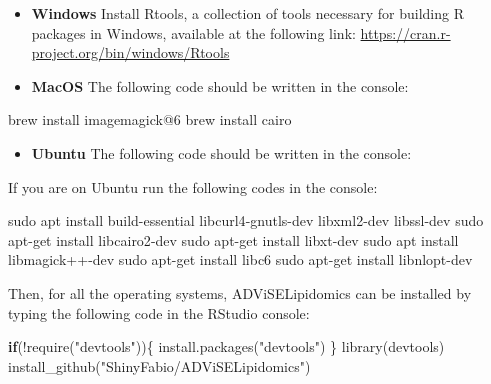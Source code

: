 \documentclass[
]{book}
\newenvironment{Shaded}{\begin{snugshade}}{\end{snugshade}}
\newcommand{\ControlFlowTok}[1]{\textcolor[rgb]{0.13,0.29,0.53}{\textbf{#1}}}
\newcommand{\DecValTok}[1]{\textcolor[rgb]{0.00,0.00,0.81}{#1}}
\newcommand{\FunctionTok}[1]{\textcolor[rgb]{0.00,0.00,0.00}{#1}}
\newcommand{\NormalTok}[1]{#1}
\newcommand{\SpecialCharTok}[1]{\textcolor[rgb]{0.00,0.00,0.00}{#1}}
\newcommand{\StringTok}[1]{\textcolor[rgb]{0.31,0.60,0.02}{#1}}
\providecommand{\tightlist}{%
  \setlength{\itemsep}{0pt}\setlength{\parskip}{0pt}}
\begin{document}
\begin{itemize}
\item
  \textbf{Windows} Install Rtools, a collection of tools necessary for building R packages in Windows, available at the following link: \url{https://cran.r-project.org/bin/windows/Rtools}
\item
  \textbf{MacOS} The following code should be written in the console:
\end{itemize}

\begin{Shaded}
\begin{Highlighting}[]
\NormalTok{brew install imagemagick}\SpecialCharTok{@}\DecValTok{6}
\NormalTok{brew install cairo}
\end{Highlighting}
\end{Shaded}

\begin{itemize}
\tightlist
\item
  \textbf{Ubuntu} The following code should be written in the console:
\end{itemize}

If you are on Ubuntu run the following codes in the console:

\begin{Shaded}
\begin{Highlighting}[]
\NormalTok{sudo apt install build}\SpecialCharTok{{-}}\NormalTok{essential libcurl4}\SpecialCharTok{{-}}\NormalTok{gnutls}\SpecialCharTok{{-}}\NormalTok{dev libxml2}\SpecialCharTok{{-}}\NormalTok{dev libssl}\SpecialCharTok{{-}}\NormalTok{dev}
\NormalTok{sudo apt}\SpecialCharTok{{-}}\NormalTok{get install libcairo2}\SpecialCharTok{{-}}\NormalTok{dev}
\NormalTok{sudo apt}\SpecialCharTok{{-}}\NormalTok{get install libxt}\SpecialCharTok{{-}}\NormalTok{dev}
\NormalTok{sudo apt install libmagick}\SpecialCharTok{++{-}}\NormalTok{dev}
\NormalTok{sudo apt}\SpecialCharTok{{-}}\NormalTok{get install libc6}
\NormalTok{sudo apt}\SpecialCharTok{{-}}\NormalTok{get install libnlopt}\SpecialCharTok{{-}}\NormalTok{dev}
\end{Highlighting}
\end{Shaded}

Then, for all the operating systems, ADViSELipidomics can be installed by typing the following code in the RStudio console:

\begin{Shaded}
\begin{Highlighting}[]
\ControlFlowTok{if}\NormalTok{(}\SpecialCharTok{!}\FunctionTok{require}\NormalTok{(}\StringTok{"devtools"}\NormalTok{))\{}
  \FunctionTok{install.packages}\NormalTok{(}\StringTok{"devtools"}\NormalTok{)}
\NormalTok{\}}
\FunctionTok{library}\NormalTok{(devtools)}
\FunctionTok{install\_github}\NormalTok{(}\StringTok{"ShinyFabio/ADViSELipidomics"}\NormalTok{)}
\end{Highlighting}
\end{Shaded}
\end{document}
